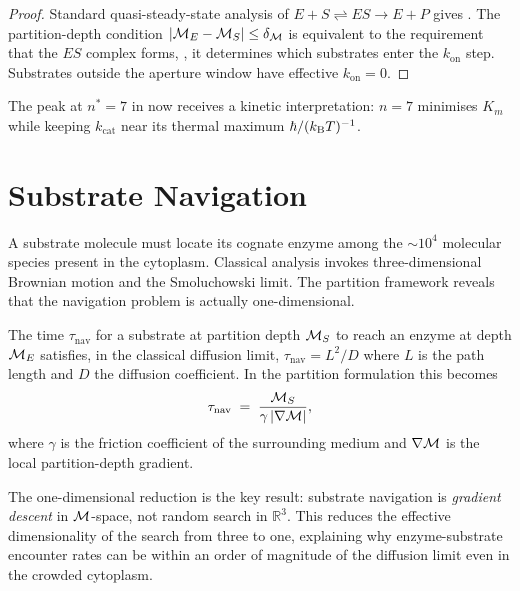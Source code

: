 \begin{proof}
Standard quasi-steady-state analysis of $E + S \rightleftharpoons ES \to E + P$
gives .  The partition-depth condition $|\mathcal{M}_E - \mathcal{M}_S| \le
\delta_{\mathcal{M}}$ is equivalent to the requirement that the $ES$ complex forms, \ie,
it determines which substrates enter the $k_\mathrm{on}$ step.  Substrates
outside the aperture window have effective $k_\mathrm{on}=0$.
\end{proof}

\begin{remark}
The peak at $n^*=7$ in  now receives a kinetic
interpretation: $n=7$ minimises $K_m$ while keeping $k_\mathrm{cat}$ near its
thermal maximum $\hbar/(k_{\mathrm{B}} T)^{-1}$.
\end{remark}

\section{Substrate Navigation}
\label{sec:substrate}

A substrate molecule must locate its cognate enzyme among the $\sim 10^4$
molecular species present in the cytoplasm.  Classical analysis invokes
three-dimensional Brownian motion and the Smoluchowski limit.  The partition
framework reveals that the navigation problem is actually one-dimensional.

\begin{theorem}
\label{thm:nav-time}
The time $\tau_\mathrm{nav}$ for a substrate at partition depth $\mathcal{M}_S$ to
reach an enzyme at depth $\mathcal{M}_E$ satisfies, in the classical diffusion limit,
$\tau_\mathrm{nav} = L^2/D$ where $L$ is the path length and $D$ the diffusion
coefficient.  In the partition formulation this becomes
\begin{equation}
    \tau_\mathrm{nav}
    \;=\;
    \frac{\mathcal{M}_S}{\gamma\,|\nabla\mathcal{M}|},
    \label{eq:nav-time}
\end{equation}
where $\gamma$ is the friction coefficient of the surrounding medium and
$\nabla\mathcal{M}$ is the local partition-depth gradient.
\end{theorem}

The one-dimensional reduction is the key result: substrate navigation is
\emph{gradient descent} in $\mathcal{M}$-space, not random search in $\mathbb{R}^3$.
This reduces the effective dimensionality of the search from three to one,
explaining why enzyme-substrate encounter rates can be within an order of
magnitude of the diffusion limit even in the crowded cytoplasm.


